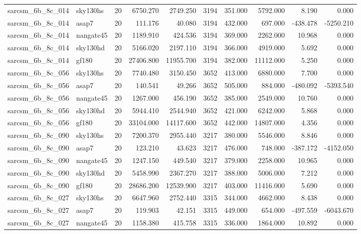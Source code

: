 \begin{tabular}{llrrrrrrrr}
sarcsm\_6b\_8c\_014 & sky130hs & 20 & 6750.270 & 2749.250 & 3194 & 351.000 & 5792.000 & 8.190 & 0.000 \\
sarcsm\_6b\_8c\_014 & asap7 & 20 & 111.176 & 40.080 & 3194 & 432.000 & 697.000 & -438.478 & -5250.210 \\
sarcsm\_6b\_8c\_014 & nangate45 & 20 & 1189.910 & 424.536 & 3194 & 369.000 & 2262.000 & 10.968 & 0.000 \\
sarcsm\_6b\_8c\_014 & sky130hd & 20 & 5166.020 & 2197.110 & 3194 & 366.000 & 4919.000 & 5.692 & 0.000 \\
sarcsm\_6b\_8c\_014 & gf180 & 20 & 27406.800 & 11955.700 & 3194 & 382.000 & 11112.000 & 5.250 & 0.000 \\
sarcsm\_6b\_8c\_056 & sky130hs & 20 & 7740.480 & 3150.450 & 3652 & 413.000 & 6880.000 & 7.700 & 0.000 \\
sarcsm\_6b\_8c\_056 & asap7 & 20 & 140.541 & 49.266 & 3652 & 505.000 & 884.000 & -480.092 & -5393.540 \\
sarcsm\_6b\_8c\_056 & nangate45 & 20 & 1267.000 & 456.190 & 3652 & 385.000 & 2549.000 & 10.760 & 0.000 \\
sarcsm\_6b\_8c\_056 & sky130hd & 20 & 5944.410 & 2544.940 & 3652 & 421.000 & 6242.000 & 5.868 & 0.000 \\
sarcsm\_6b\_8c\_056 & gf180 & 20 & 33104.000 & 14117.600 & 3652 & 442.000 & 14807.000 & 4.356 & 0.000 \\
sarcsm\_6b\_8c\_090 & sky130hs & 20 & 7200.370 & 2955.440 & 3217 & 380.000 & 5546.000 & 8.846 & 0.000 \\
sarcsm\_6b\_8c\_090 & asap7 & 20 & 123.210 & 43.623 & 3217 & 476.000 & 748.000 & -387.172 & -4152.050 \\
sarcsm\_6b\_8c\_090 & nangate45 & 20 & 1247.150 & 449.540 & 3217 & 379.000 & 2258.000 & 10.965 & 0.000 \\
sarcsm\_6b\_8c\_090 & sky130hd & 20 & 5458.990 & 2367.270 & 3217 & 388.000 & 5006.000 & 7.212 & 0.000 \\
sarcsm\_6b\_8c\_090 & gf180 & 20 & 28686.200 & 12539.900 & 3217 & 403.000 & 11416.000 & 5.690 & 0.000 \\
sarcsm\_6b\_8c\_027 & sky130hs & 20 & 6647.960 & 2752.440 & 3315 & 344.000 & 4662.000 & 8.438 & 0.000 \\
sarcsm\_6b\_8c\_027 & asap7 & 20 & 119.903 & 42.151 & 3315 & 449.000 & 654.000 & -497.559 & -6043.670 \\
sarcsm\_6b\_8c\_027 & nangate45 & 20 & 1158.380 & 415.758 & 3315 & 336.000 & 1864.000 & 10.892 & 0.000 \\

\end{tabular}
